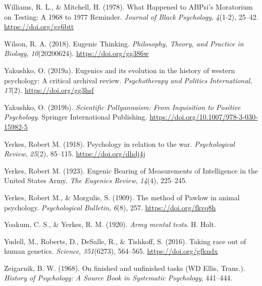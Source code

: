 \documentclass[
  oneside,
  12pt]{crumpbook}
\newlength{\cslhangindent}
\newlength{\cslentryspacingunit} %
\newenvironment{CSLReferences}[2] %
 {%
  \setlength{\parindent}{0pt}
  \ifodd #1
  \let\oldpar\par
  \def\par{\hangindent=\cslhangindent\oldpar}
  \fi
  \setlength{\parskip}{#2\cslentryspacingunit}
 }%
 {}
\begin{document}
\begin{CSLReferences}{1}{0}
\leavevmode{}%
Williams, R. L., \& Mitchell, H. (1978). What {Happened} to {ABPsi}'s {Moratorium} on {Testing}: {A} 1968 to 1977 {Reminder}. \emph{Journal of Black Psychology}, \emph{4}(1-2), 25--42. \url{https://doi.org/gg6btt}

\leavevmode{}%
Wilson, R. A. (2018). Eugenic {Thinking}. \emph{Philosophy, Theory, and Practice in Biology}, \emph{10}(20200624). \url{https://doi.org/gg386w}

\leavevmode{}%
Yakushko, O. (2019a). Eugenics and its evolution in the history of western psychology: {A} critical archival review. \emph{Psychotherapy and Politics International}, \emph{17}(2). \url{https://doi.org/gg3hsf}

\leavevmode{}%
Yakushko, O. (2019b). \emph{Scientific {Pollyannaism}: {From Inquisition} to {Positive Psychology}}. {Springer International Publishing}. \url{https://doi.org/10.1007/978-3-030-15982-5}

\leavevmode{}%
Yerkes, Robert M. (1918). Psychology in relation to the war. \emph{Psychological Review}, \emph{25}(2), 85--115. \url{https://doi.org/dhdj4j}

\leavevmode{}%
Yerkes, Robert M. (1923). Eugenic {Bearing} of {Measurements} of {Intelligence} in the {United States Army}. \emph{The Eugenics Review}, \emph{14}(4), 225--245.

\leavevmode{}%
Yerkes, Robert M., \& Morgulis, S. (1909). The method of {Pawlow} in animal psychology. \emph{Psychological Bulletin}, \emph{6}(8), 257. \url{https://doi.org/fkvq8h}

\leavevmode{}%
Yoakum, C. S., \& Yerkes, R. M. (1920). \emph{Army mental tests}. {H. Holt}.

\leavevmode{}%
Yudell, M., Roberts, D., DeSalle, R., \& Tishkoff, S. (2016). Taking race out of human genetics. \emph{Science}, \emph{351}(6273), 564--565. \url{https://doi.org/gfkndx}

\leavevmode{}%
Zeigarnik, B. W. (1968). On finished and unfinished tasks ({WD Ellis}, {Trans}.). \emph{History of Psychology: A Source Book in Systematic Psychology}, 441--444.


\end{CSLReferences}
\end{document}
